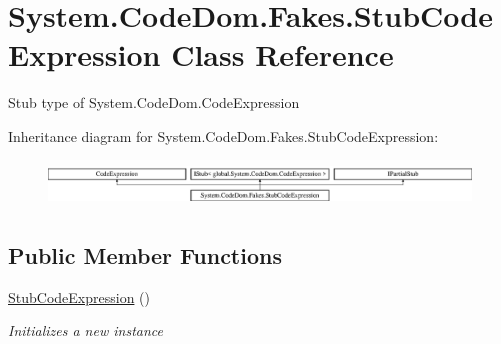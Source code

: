 \hypertarget{class_system_1_1_code_dom_1_1_fakes_1_1_stub_code_expression}{\section{System.\-Code\-Dom.\-Fakes.\-Stub\-Code\-Expression Class Reference}
\label{class_system_1_1_code_dom_1_1_fakes_1_1_stub_code_expression}
}


Stub type of System.\-Code\-Dom.\-Code\-Expression 


Inheritance diagram for System.\-Code\-Dom.\-Fakes.\-Stub\-Code\-Expression\-:\begin{figure}[H]
\begin{center}
\leavevmode
\includegraphics[height=1.224044cm]{class_system_1_1_code_dom_1_1_fakes_1_1_stub_code_expression}
\end{center}
\end{figure}
\subsection*{Public Member Functions}
\begin{DoxyCompactItemize}
\item 
\hyperlink{class_system_1_1_code_dom_1_1_fakes_1_1_stub_code_expression_a6cda28883a80a65e53c62b022440f45e}{Stub\-Code\-Expression} ()
\begin{DoxyCompactList}\small\item\em Initializes a new instance\end{DoxyCompactList}\end{DoxyCompactItemize}
